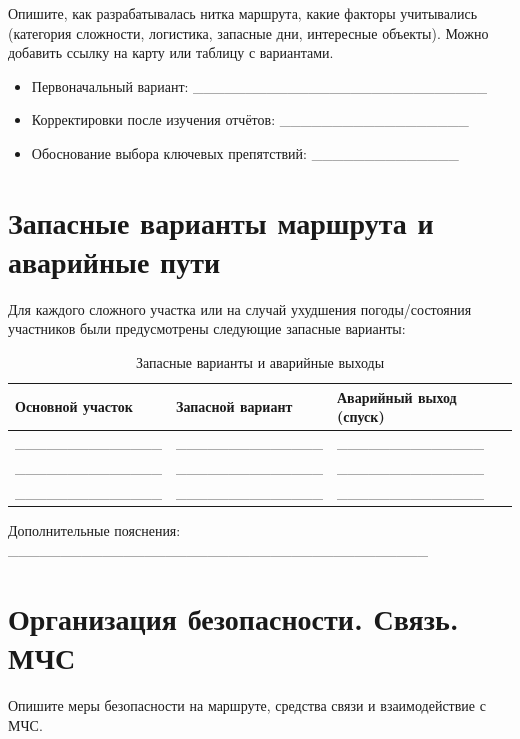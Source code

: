 Опишите, как разрабатывалась нитка маршрута, какие факторы учитывались (категория сложности, логистика, запасные дни, интересные объекты). Можно добавить ссылку на карту или таблицу с вариантами.

\begin{itemize}
    \item Первоначальный вариант: \_\_\_\_\_\_\_\_\_\_\_\_\_\_\_\_\_\_\_\_\_\_\_\_\_\_\_\_
    \item Корректировки после изучения отчётов: \_\_\_\_\_\_\_\_\_\_\_\_\_\_\_\_\_\_
    \item Обоснование выбора ключевых препятствий: \_\_\_\_\_\_\_\_\_\_\_\_\_\_
\end{itemize}

\section{Запасные варианты маршрута и аварийные пути}

Для каждого сложного участка или на случай ухудшения погоды/состояния участников были предусмотрены следующие запасные варианты:

\begin{table}[H]
\centering
\caption{Запасные варианты и аварийные выходы}
\small
\begin{tabular}{|p{4cm}|p{4cm}|p{5cm}|}
\hline
\textbf{Основной участок} & \textbf{Запасной вариант} & \textbf{Аварийный выход (спуск)} \\
\hline
\_\_\_\_\_\_\_\_\_\_\_\_\_\_ & \_\_\_\_\_\_\_\_\_\_\_\_\_\_ & \_\_\_\_\_\_\_\_\_\_\_\_\_\_ \\
\_\_\_\_\_\_\_\_\_\_\_\_\_\_ & \_\_\_\_\_\_\_\_\_\_\_\_\_\_ & \_\_\_\_\_\_\_\_\_\_\_\_\_\_ \\
\_\_\_\_\_\_\_\_\_\_\_\_\_\_ & \_\_\_\_\_\_\_\_\_\_\_\_\_\_ & \_\_\_\_\_\_\_\_\_\_\_\_\_\_ \\
\hline
\end{tabular}
\end{table}

Дополнительные пояснения: \_\_\_\_\_\_\_\_\_\_\_\_\_\_\_\_\_\_\_\_\_\_\_\_\_\_\_\_\_\_\_\_\_\_\_\_\_\_\_\_

\section{Организация безопасности. Связь. МЧС}

Опишите меры безопасности на маршруте, средства связи и взаимодействие с МЧС.

